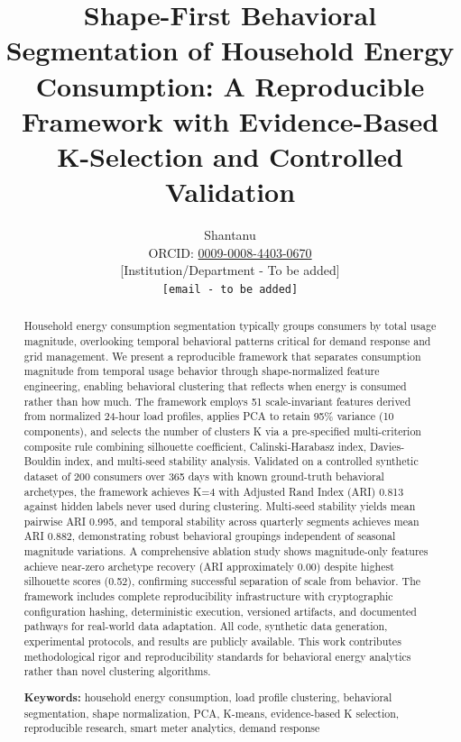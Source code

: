 \documentclass[11pt,a4paper]{article}
\title{\textbf{Shape-First Behavioral Segmentation of Household Energy Consumption: A Reproducible Framework with Evidence-Based K-Selection and Controlled Validation}}
\author{
  Shantanu\\[6pt]
  \small ORCID: \href{https://orcid.org/0009-0008-4403-0670}{0009-0008-4403-0670}\\
  \small [Institution/Department - To be added]\\
  \small \texttt{[email - to be added]}
}
\date{}
\begin{document}
\maketitle

\begin{abstract}
Household energy consumption segmentation typically groups consumers by total usage magnitude, overlooking temporal behavioral patterns critical for demand response and grid management. We present a reproducible framework that separates consumption magnitude from temporal usage behavior through shape-normalized feature engineering, enabling behavioral clustering that reflects when energy is consumed rather than how much. The framework employs 51 scale-invariant features derived from normalized 24-hour load profiles, applies PCA to retain 95\% variance (10 components), and selects the number of clusters K via a pre-specified multi-criterion composite rule combining silhouette coefficient, Calinski-Harabasz index, Davies-Bouldin index, and multi-seed stability analysis. Validated on a controlled synthetic dataset of 200 consumers over 365 days with known ground-truth behavioral archetypes, the framework achieves K=4 with Adjusted Rand Index (ARI) 0.813 against hidden labels never used during clustering. Multi-seed stability yields mean pairwise ARI 0.995, and temporal stability across quarterly segments achieves mean ARI 0.882, demonstrating robust behavioral groupings independent of seasonal magnitude variations. A comprehensive ablation study shows magnitude-only features achieve near-zero archetype recovery (ARI approximately 0.00) despite highest silhouette scores (0.52), confirming successful separation of scale from behavior. The framework includes complete reproducibility infrastructure with cryptographic configuration hashing, deterministic execution, versioned artifacts, and documented pathways for real-world data adaptation. All code, synthetic data generation, experimental protocols, and results are publicly available. This work contributes methodological rigor and reproducibility standards for behavioral energy analytics rather than novel clustering algorithms.

\textbf{Keywords:} household energy consumption, load profile clustering, behavioral segmentation, shape normalization, PCA, K-means, evidence-based K selection, reproducible research, smart meter analytics, demand response
\end{abstract}
\end{document}
